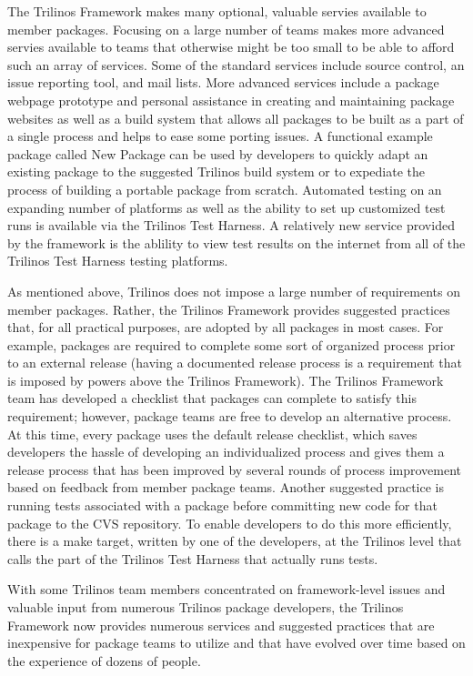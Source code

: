 \documentclass[12pt,relax]{article}
\begin{document}
  The Trilinos Framework makes many optional, valuable servies available to
  member packages.  Focusing on a large number of teams
  makes more advanced servies available to teams that otherwise might be too
  small to be able to afford such an array of services.  Some of the standard
  services include source control, an issue reporting tool, and mail lists.
  More advanced services include a package webpage prototype and personal 
  assistance in creating and maintaining package websites as well as a build 
  system that allows all packages to be built as a part of a single process 
  and helps to ease some porting issues.  A functional example package called
  New Package can be used by developers to quickly adapt an existing package 
  to the suggested Trilinos build system or to expediate the process of 
  building a portable package from scratch.  Automated testing on an expanding 
  number of platforms as well as the ability to set up customized test runs is 
  available via the Trilinos Test Harness.  A relatively new service provided 
  by  the framework is the ablility to view test results on the internet from
  all of the Trilinos Test Harness testing platforms.
  
  As mentioned above, Trilinos does not impose a large number of requirements
  on member packages.  Rather, the Trilinos Framework provides suggested 
  practices that,
  for all practical purposes, are adopted by all packages in most cases.  For
  example, packages are required to complete some sort of organized process
  prior to an external release (having a documented release process is a 
  requirement that is imposed by powers above the Trilinos Framework).  The 
  Trilinos Framework team has developed a checklist that packages can complete
  to satisfy this requirement; however, package teams are free to develop an
  alternative process.  At this time, every package uses the default release
  checklist, which saves developers the hassle of developing an individualized
  process and gives them a release process that has
  been improved by several rounds of process improvement based on feedback from
  member package teams.  Another suggested practice is running tests
  associated with a package before committing new code for that package to the 
  CVS repository.  To enable developers to do this more efficiently, there is
  a make target, written by one of the developers, at the Trilinos level that
  calls the part of the Trilinos Test Harness that actually runs tests.

  With some Trilinos team members concentrated on framework-level issues and
  valuable input from numerous Trilinos package developers, the Trilinos 
  Framework now provides numerous services and suggested practices that are
  inexpensive for package teams to utilize and that have evolved over 
  time based on the experience of dozens of people.
\end{document}
